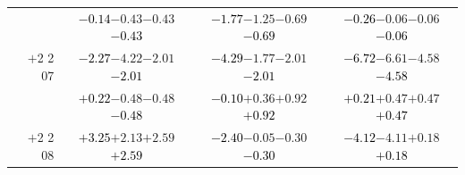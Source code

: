 \documentclass[compress]{beamer}
\begin{document}
\begin{frame}
\begin{tabular}{r | c | c | c}
          & \textcolor{black}{$-0.14$}\hspace{0.1 cm}$-0.43$\hspace{0.1 cm}$-0.43$\hspace{0.1 cm}\textcolor{black}{$-0.43$} & \textcolor{black}{$-1.77$}\hspace{0.1 cm}$-1.25$\hspace{0.1 cm}$-0.69$\hspace{0.1 cm}\textcolor{black}{$-0.69$} & \textcolor{black}{$-0.26$}\hspace{0.1 cm}$-0.06$\hspace{0.1 cm}$-0.06$\hspace{0.1 cm}\textcolor{black}{$-0.06$} \\
$+$2 2 07 & \textcolor{black}{$-2.27$}\hspace{0.1 cm}$-4.22$\hspace{0.1 cm}$-2.01$\hspace{0.1 cm}\textcolor{black}{$-2.01$} & \textcolor{black}{$-4.29$}\hspace{0.1 cm}$-1.77$\hspace{0.1 cm}$-2.01$\hspace{0.1 cm}\textcolor{black}{$-2.01$} & \textcolor{black}{$-6.72$}\hspace{0.1 cm}$-6.61$\hspace{0.1 cm}$-4.58$\hspace{0.1 cm}\textcolor{black}{$-4.58$} \\
          & \textcolor{black}{$+0.22$}\hspace{0.1 cm}$-0.48$\hspace{0.1 cm}$-0.48$\hspace{0.1 cm}\textcolor{black}{$-0.48$} & \textcolor{black}{$-0.10$}\hspace{0.1 cm}$+0.36$\hspace{0.1 cm}$+0.92$\hspace{0.1 cm}\textcolor{black}{$+0.92$} & \textcolor{black}{$+0.21$}\hspace{0.1 cm}$+0.47$\hspace{0.1 cm}$+0.47$\hspace{0.1 cm}\textcolor{black}{$+0.47$} \\
$+$2 2 08 & \textcolor{black}{$+3.25$}\hspace{0.1 cm}$+2.13$\hspace{0.1 cm}$+2.59$\hspace{0.1 cm}\textcolor{black}{$+2.59$} & \textcolor{black}{$-2.40$}\hspace{0.1 cm}$-0.05$\hspace{0.1 cm}$-0.30$\hspace{0.1 cm}\textcolor{black}{$-0.30$} & \textcolor{black}{$-4.12$}\hspace{0.1 cm}$-4.11$\hspace{0.1 cm}$+0.18$\hspace{0.1 cm}\textcolor{black}{$+0.18$} \\

\end{tabular}
\end{frame}
\end{document}
